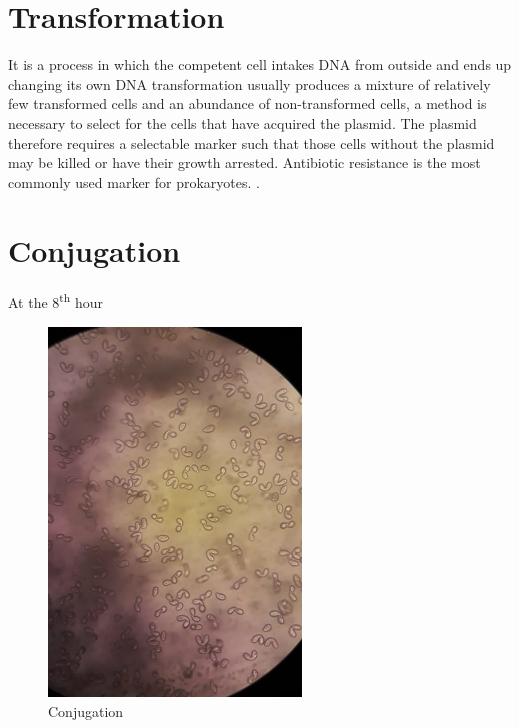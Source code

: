 \documentclass[11pt,twoside,a4paper]{article}
\begin{document}
\section{Transformation}
It is a process in which the competent cell intakes DNA from outside and ends up changing its own DNA transformation usually produces a mixture of relatively few transformed cells and an abundance of non-transformed cells, a method is necessary to select for the cells that have acquired the plasmid.
The plasmid therefore requires a selectable marker such that those cells without the plasmid may be killed or have their growth arrested. Antibiotic resistance is the most commonly used marker for prokaryotes. .
\section{Conjugation}
At the 8\textsuperscript{th} hour
\begin{figure}
	\centering
	\includegraphics[width=0.6\textwidth]{images/conjugation1.jpeg}
	\caption{Conjugation}
	\label{conjugation1}
\end{figure}
\end{document}
